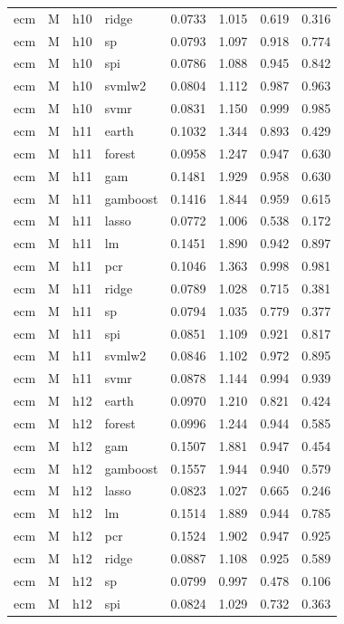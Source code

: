 \begin{ThreePartTable}
\begin{longtable}[t]{llclcccc}
ecm & M & h10 & ridge & 0.0733 & 1.015 & 0.619 & 0.316\\
ecm & M & h10 & sp & 0.0793 & 1.097 & 0.918 & 0.774\\
ecm & M & h10 & spi & 0.0786 & 1.088 & 0.945 & 0.842\\
ecm & M & h10 & svmlw2 & 0.0804 & 1.112 & 0.987 & 0.963\\
ecm & M & h10 & svmr & 0.0831 & 1.150 & 0.999 & 0.985\\
\addlinespace
ecm & M & h11 & earth & 0.1032 & 1.344 & 0.893 & 0.429\\
ecm & M & h11 & forest & 0.0958 & 1.247 & 0.947 & 0.630\\
ecm & M & h11 & gam & 0.1481 & 1.929 & 0.958 & 0.630\\
ecm & M & h11 & gamboost & 0.1416 & 1.844 & 0.959 & 0.615\\
ecm & M & h11 & lasso & 0.0772 & 1.006 & 0.538 & 0.172\\
ecm & M & h11 & lm & 0.1451 & 1.890 & 0.942 & 0.897\\
ecm & M & h11 & pcr & 0.1046 & 1.363 & 0.998 & 0.981\\
ecm & M & h11 & ridge & 0.0789 & 1.028 & 0.715 & 0.381\\
ecm & M & h11 & sp & 0.0794 & 1.035 & 0.779 & 0.377\\
ecm & M & h11 & spi & 0.0851 & 1.109 & 0.921 & 0.817\\
ecm & M & h11 & svmlw2 & 0.0846 & 1.102 & 0.972 & 0.895\\
ecm & M & h11 & svmr & 0.0878 & 1.144 & 0.994 & 0.939\\
\addlinespace
ecm & M & h12 & earth & 0.0970 & 1.210 & 0.821 & 0.424\\
ecm & M & h12 & forest & 0.0996 & 1.244 & 0.944 & 0.585\\
ecm & M & h12 & gam & 0.1507 & 1.881 & 0.947 & 0.454\\
ecm & M & h12 & gamboost & 0.1557 & 1.944 & 0.940 & 0.579\\
ecm & M & h12 & lasso & 0.0823 & 1.027 & 0.665 & 0.246\\
ecm & M & h12 & lm & 0.1514 & 1.889 & 0.944 & 0.785\\
ecm & M & h12 & pcr & 0.1524 & 1.902 & 0.947 & 0.925\\
ecm & M & h12 & ridge & 0.0887 & 1.108 & 0.925 & 0.589\\
ecm & M & h12 & sp & 0.0799 & 0.997 & 0.478 & 0.106\\
ecm & M & h12 & spi & 0.0824 & 1.029 & 0.732 & 0.363\\

\end{longtable}
\end{ThreePartTable}

